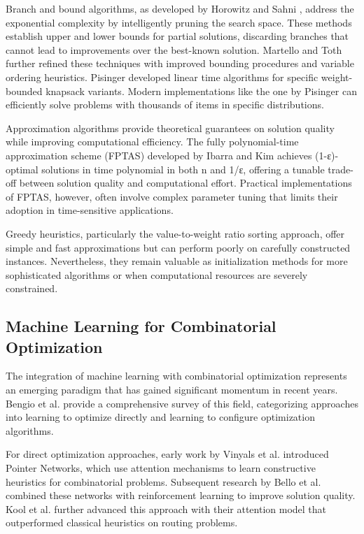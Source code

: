 \documentclass[conference, a4paper]{IEEEtran}
\begin{document}
Branch and bound algorithms, as developed by Horowitz and Sahni \cite{horowitz1974computing}, address the exponential complexity by intelligently pruning the search space. These methods establish upper and lower bounds for partial solutions, discarding branches that cannot lead to improvements over the best-known solution. Martello and Toth \cite{martello1990knapsack} further refined these techniques with improved bounding procedures and variable ordering heuristics. Pisinger \cite{pisinger1999linear} developed linear time algorithms for specific weight-bounded knapsack variants. Modern implementations like the one by Pisinger \cite{pisinger2005hard} can efficiently solve problems with thousands of items in specific distributions.

Approximation algorithms provide theoretical guarantees on solution quality while improving computational efficiency. The fully polynomial-time approximation scheme (FPTAS) developed by Ibarra and Kim \cite{ibarra1975fast} achieves (1-ε)-optimal solutions in time polynomial in both n and 1/ε, offering a tunable trade-off between solution quality and computational effort. Practical implementations of FPTAS, however, often involve complex parameter tuning that limits their adoption in time-sensitive applications.

Greedy heuristics, particularly the value-to-weight ratio sorting approach, offer simple and fast approximations but can perform poorly on carefully constructed instances. Nevertheless, they remain valuable as initialization methods for more sophisticated algorithms or when computational resources are severely constrained.

\subsection{Machine Learning for Combinatorial Optimization}
The integration of machine learning with combinatorial optimization represents an emerging paradigm that has gained significant momentum in recent years. Bengio et al. \cite{bengio2021machine} provide a comprehensive survey of this field, categorizing approaches into learning to optimize directly and learning to configure optimization algorithms.

For direct optimization approaches, early work by Vinyals et al. \cite{vinyals2015pointer} introduced Pointer Networks, which use attention mechanisms to learn constructive heuristics for combinatorial problems. Subsequent research by Bello et al. \cite{bello2017neural} combined these networks with reinforcement learning to improve solution quality. Kool et al. \cite{kool2019attention} further advanced this approach with their attention model that outperformed classical heuristics on routing problems.
\end{document}
